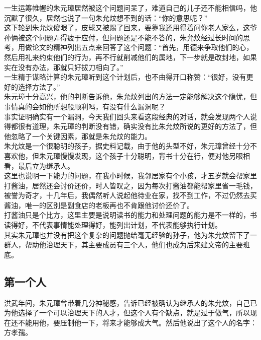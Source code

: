 \begin{multicols}{\theparacolNo}
一生运筹帷幄的朱元璋居然被这个问题问呆了，难道自己的儿子还不能相信吗，他沉默了很久，居然也说了一句朱允炆想不到的话：“你的意思呢？”\\

这下轮到朱允炆傻眼了，皮球又被踢了回来，要靠我还用得着问你老人家么，这爷孙俩被这个问题弄得疲于应付，但问题还是不能不答的，朱允炆经过长时间的思考，用做论文的精神列出五点来回答了这个问题：“首先，用德来争取他们的心，然后用礼来约束他们的行为，再不行就削减他们的属地，下一步就是改封地，如果实在没有办法，那就只好拔刀相向了。”\\

一生精于谋略计算的朱元璋听到这个计划后，也不由得开口称赞：“很好，没有更好的选择方法了。”\\

朱元璋十分高兴，他的判断告诉他，朱允炆列出的方法一定能够解决这个隐忧，但事情真的会如他所想般顺利吗，有没有什么漏洞呢？\\

事实证明确实有一个漏洞，今天我们回头来看这段经典的对话，就会发现两个人说得都很有道理，朱元璋的判断没有错，确实没有比朱允炆所说的更好的方法了，但他忽略了一个关键因素，那就是朱允炆的能力。\\

朱允炆是一个很聪明的孩子，据史料记载，由于他的头型不好，朱元璋曾经十分不喜欢他，但朱元璋慢慢发现，这个孩子十分聪明，背书十分在行，便对他另眼相看，最后立为继承人。\\

这里也说明一下能力的问题，在我小时候，我邻居家有个小孩，才五岁就会帮家里打酱油，居然还会讨价还价，时人皆叹之，因为每次打酱油都能帮家里省一毛钱，被誉为奇才，十几年后，我偶然听人说起他待业在家，找不到工作，不过仍然去买酱油，唯一的区别是副食店的老板再也不肯跟他讨价还价了。\\

打酱油只是个比方，这里主要是说明读书的能力和处理问题的能力是不一样的，书读得好，不代表事情能处理得好，能列出计划，不代表能够执行计划。\\

其实朱元璋也并没有把这个复杂的问题抛给毫无经验的孙子，他为朱允炆留下了一群人，帮助他治理天下，其主要成员有三个人，他们也成为后来建文帝的主要班底。\\

\subsection{第一个人}
洪武年间，朱元璋曾带着几分神秘感，告诉已经被确认为继承人的朱允炆，自己已为他选择了一个可以治理天下的人才，但这个人有个缺点，就是过于傲气，所以现在还不能用他，要压制他一下，将来才能够成大气。然后他说出了这个人的名字：方孝孺。\\


\end{multicols}
